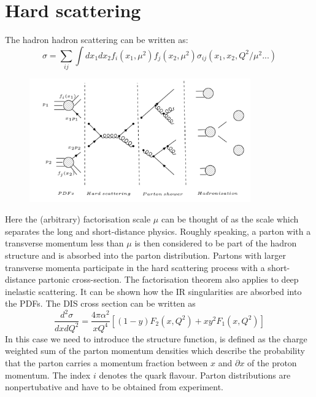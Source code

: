 \section{Hard scattering}
The hadron hadron scattering can be written as:
\begin{equation}
\sigma = \sum_{ij} \int dx_1 dx_2 f_i(x_1, \mu^2)f_j(x_2, \mu^2) \sigma_{ij}(x_1, x_2, Q^2/\mu^2... )
\end{equation}
\begin{figure}[h!]
\centering
\includegraphics[width=0.85\textwidth]{images/Intro/Hard.png}
\end{figure}
Here the (arbitrary) factorisation scale $ \mu $ can be thought of
as the scale which separates the long and short-distance physics.
Roughly speaking, a parton with a transverse momentum less
than $ \mu $ is then considered to be part of the hadron structure and
is absorbed into the parton distribution. Partons with larger transverse momenta participate in the hard scattering process with a short-distance partonic cross-section.
The factorisation theorem also applies to deep inelastic scattering. It can be shown how the IR singularities are absorbed into the PDFs. The DIS cross section can be written as ~\cite{Ellis:1991qj}
\begin{equation}
\frac{d^2 \sigma}{dx dQ^2}=\frac{4\pi \alpha^2}{x Q^4}[(1-y)F_2 (x, Q^2)+xy^2 F_1(x, Q^2)]
\end{equation}
In this case we need to introduce the structure function, is defined as the charge weighted sum of the parton momentum densities which describe the probability that the parton carries a momentum
fraction between $ x $ and $ \partial x $ of the proton momentum. The index $i$ denotes the quark flavour. Parton distributions are nonpertubative and have to be obtained from experiment.

